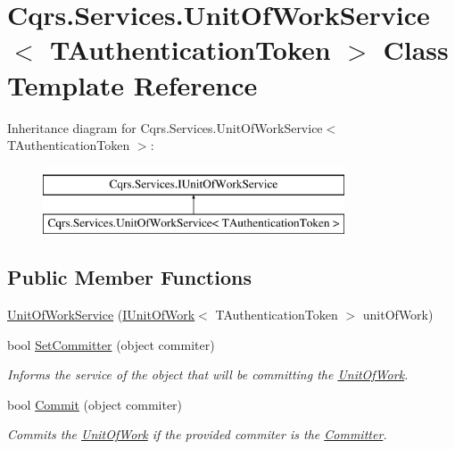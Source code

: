 \hypertarget{classCqrs_1_1Services_1_1UnitOfWorkService}{}\section{Cqrs.\+Services.\+Unit\+Of\+Work\+Service$<$ T\+Authentication\+Token $>$ Class Template Reference}
\label{classCqrs_1_1Services_1_1UnitOfWorkService}
Inheritance diagram for Cqrs.\+Services.\+Unit\+Of\+Work\+Service$<$ T\+Authentication\+Token $>$\+:\begin{figure}[H]
\begin{center}
\leavevmode
\includegraphics[height=2.000000cm]{classCqrs_1_1Services_1_1UnitOfWorkService}
\end{center}
\end{figure}
\subsection*{Public Member Functions}
\begin{DoxyCompactItemize}
\item 
\hyperlink{classCqrs_1_1Services_1_1UnitOfWorkService_a187b3f612490a8316770bb7c6a9aa25f}{Unit\+Of\+Work\+Service} (\hyperlink{interfaceCqrs_1_1Domain_1_1IUnitOfWork}{I\+Unit\+Of\+Work}$<$ T\+Authentication\+Token $>$ unit\+Of\+Work)
\item 
bool \hyperlink{classCqrs_1_1Services_1_1UnitOfWorkService_a663471bc62f79df22c800ad683a27f59}{Set\+Committer} (object commiter)
\begin{DoxyCompactList}\small\item\em Informs the service of the object that will be committing the \hyperlink{classCqrs_1_1Services_1_1UnitOfWorkService_a1ba76512e37e5006c2b65d071803e99f}{Unit\+Of\+Work}. \end{DoxyCompactList}\item 
bool \hyperlink{classCqrs_1_1Services_1_1UnitOfWorkService_a3291740821150ecea174820ed27ee56c}{Commit} (object commiter)
\begin{DoxyCompactList}\small\item\em Commits the \hyperlink{classCqrs_1_1Services_1_1UnitOfWorkService_a1ba76512e37e5006c2b65d071803e99f}{Unit\+Of\+Work} if the provided {\itshape commiter}  is the \hyperlink{classCqrs_1_1Services_1_1UnitOfWorkService_aabeccb6ba949fe02b8676b324f85950b}{Committer}. \end{DoxyCompactList}\end{DoxyCompactItemize}
